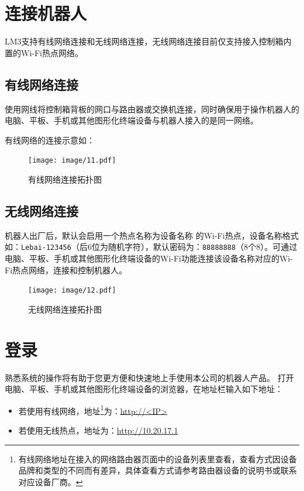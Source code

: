 \clearpage

\section{连接机器人}
LM3支持有线网络连接和无线网络连接，无线网络连接目前仅支持接入控制箱内置的Wi-Fi热点网络。
\subsection{有线网络连接}

使用网线将控制箱背板的网口与路由器或交换机连接，同时确保用于操作机器人的电脑、平板、手机或其他图形化终端设备与机器人接入的是同一网络。

有线网络的连接示意如：

\begin{figure}[ht]
    \centering
    \texttt{[image: image/11.pdf]}
    \caption{有线网络连接拓扑图}
    \label{fig:有线网络连接拓扑图}
\end{figure}

\subsection{无线网络连接}
机器人出厂后，默认会启用一个热点名称为设备名称  的Wi-Fi热点，设备名称格式如：\verb|Lebai-123456|（后6位为随机字符），默认密码为：\verb|88888888|（8个8）。可通过电脑、平板、手机或其他图形化终端设备的Wi-Fi功能连接该设备名称对应的Wi-Fi热点网络，连接和控制机器人。

\begin{figure}[ht]
    \centering
    \texttt{[image: image/12.pdf]}
    \caption{无线网络连接拓扑图}
    \label{fig:无线网络连接拓扑图}
\end{figure}

\clearpage

\section{登录\LM}
熟悉\LM 系统的操作将有助于您更方便和快速地上手使用本公司的机器人产品。
打开电脑、平板、手机或其他图形化终端设备的浏览器，在地址栏输入如下地址：
\begin{itemize}
	\item 若使用有线网络，地址\footnote{有线网络地址在接入的网络路由器页面中的设备列表里查看，查看方式因设备品牌和类型的不同而有差异，具体查看方式请参考路由器设备的说明书或联系对应设备厂商。}为：\url{http://<IP>}
	\item 若使用无线热点，地址为：\url{http://10.20.17.1}
\end{itemize}

